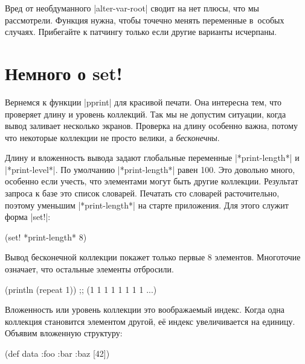 Вред от необдуманного \spverb|alter-var-root| сводит на нет плюсы, что мы
рассмотрели. Функция нужна, чтобы точечно менять переменные в~особых
случаях. Прибегайте к патчингу только если другие варианты исчерпаны.

\section{Немного о set!}


Вернемся к функции \spverb|pprint| для красивой печати. Она интересна тем, что
проверяет длину и уровень коллекций. Так мы не допустим ситуации, когда вывод
заливает несколько экранов. Проверка на длину особенно важна, потому что
некоторые коллекции не просто велики, а \emph{бесконечны}.


Длину и вложенность вывода задают глобальные переменные \spverb|*print-length*|
и \spverb|*print-level*|. По умолчанию \spverb|*print-length*| равен 100. Это
довольно много, особенно если учесть, что элементами могут быть другие
коллекции. Результат запроса к базе это список словарей. Печатать сто
словарей расточительно, поэтому уменьшим \spverb|*print-length*| на старте
приложения. Для этого служит форма \spverb|set!|:

\begin{english}
  \begin{clojure}
(set! *print-length* 8)
  \end{clojure}
\end{english}

\noindent
Вывод бесконечной коллекции покажет только первые 8 элементов. Многоточие
означает, что остальные элементы отбросили.

\begin{english}
  \begin{clojure}
(println (repeat 1))
;; (1 1 1 1 1 1 1 1 ...)
  \end{clojure}
\end{english}

Вложенность или уровень коллекции это воображаемый индекс. Когда одна коллекция
становится элементом другой, е\"{е} индекс увеличивается на единицу. Объявим
вложенную структуру:

\begin{english}
  \begin{clojure}
(def data {:foo {:bar {:baz [42]}}})
  \end{clojure}
\end{english}

